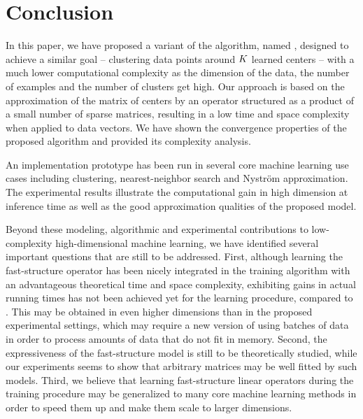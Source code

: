 \section{Conclusion}
\label{sec:conclusion}

In this paper, we have proposed a variant of the \kmeans algorithm, named \qkmeans, designed to achieve a similar goal -- clustering data points around $K$ learned centers -- with a much lower computational complexity as the dimension of the data, the number of examples and the number of clusters get high. 
Our approach is based on the approximation of the matrix of centers by an operator structured as a product of a small number of sparse matrices, resulting in a low time and space complexity when applied to data vectors.
We have shown the convergence properties of the proposed algorithm and provided its complexity analysis.

An implementation prototype has been run in several core machine learning use cases including clustering, nearest-neighbor search and Nystr\"om approximation. 
The experimental results illustrate the computational gain in high dimension at inference time as well as the good approximation qualities of the proposed model.

Beyond these modeling, algorithmic and experimental contributions to low-complexity high-dimensional machine learning, we have identified several important questions that are still to be addressed.
First, although learning the fast-structure operator has been nicely integrated in the training algorithm with an advantageous theoretical time and space complexity, exhibiting gains in actual running times has not been achieved yet for the \qkmeans learning procedure, compared to \kmeans.
This may be obtained in even higher dimensions than in the proposed experimental settings, which may require a new version of \qkmeans using batches of data in order to process amounts of data that do not fit in memory.
Second, the expressiveness of the fast-structure model is still to be theoretically studied, while our experiments seems to show that arbitrary matrices may be well fitted by such models.
Third, we believe that learning fast-structure linear operators during the training procedure may be generalized to many core machine learning methods in order to speed them up and make them scale to larger dimensions.

